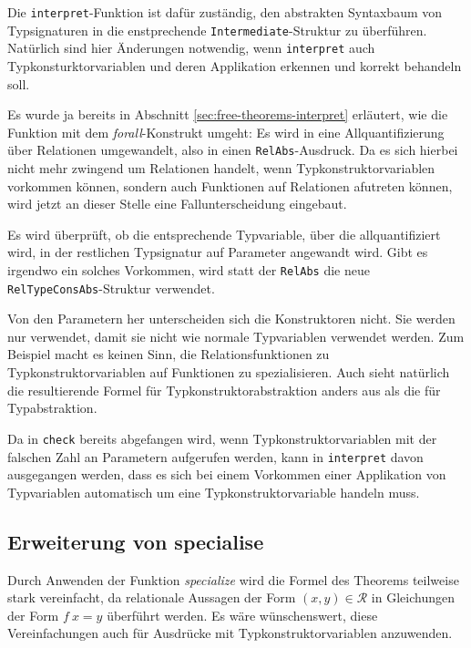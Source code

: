 Die \texttt{interpret}-Funktion ist dafür zuständig, den abstrakten Syntaxbaum von Typsignaturen in die enstprechende
\texttt{Intermediate}-Struktur zu überführen. Natürlich sind hier Änderungen notwendig, wenn \texttt{interpret} auch
Typkonsturktorvariablen und deren Applikation erkennen und korrekt behandeln soll.

Es wurde ja bereits in Abschnitt \ref{sec:free-theorems-interpret} erläutert, wie die Funktion mit dem \textit{forall}-Konstrukt
umgeht: Es wird in eine Allquantifizierung über Relationen umgewandelt, also in einen \texttt{RelAbs}-Ausdruck.
Da es sich hierbei nicht mehr zwingend um Relationen handelt, wenn Typkonstruktorvariablen vorkommen können, sondern auch
Funktionen auf Relationen afutreten können, wird jetzt an dieser Stelle eine Fallunterscheidung eingebaut.

Es wird überprüft, ob die entsprechende Typvariable, über die allquantifiziert wird, in der restlichen Typsignatur auf Parameter
angewandt wird. Gibt es irgendwo ein solches Vorkommen, wird statt der \texttt{RelAbs} die neue \texttt{RelTypeConsAbs}-Struktur
verwendet.

Von den Parametern her unterscheiden sich die Konstruktoren nicht. Sie werden nur verwendet, damit sie nicht wie normale
Typvariablen verwendet werden. Zum Beispiel macht es keinen Sinn, die Relationsfunktionen zu Typkonstruktorvariablen auf
Funktionen zu spezialisieren. Auch sieht natürlich die resultierende Formel für Typkonstruktorabstraktion anders aus als die
für Typabstraktion.

Da in \texttt{check} bereits abgefangen wird, wenn Typkonstruktorvariablen mit der falschen Zahl an Parametern aufgerufen
werden, kann in \texttt{interpret} davon ausgegangen werden, dass es sich bei einem Vorkommen einer
Applikation von Typvariablen automatisch um eine Typkonstruktorvariable handeln muss.



\subsection{Erweiterung von specialise}

Durch Anwenden der Funktion \textit{specialize} wird die Formel des Theorems teilweise stark vereinfacht, da relationale
Aussagen der Form $(x, y) \in \mathcal{R}$ in Gleichungen der Form $f\ x = y$ überführt werden. Es wäre wünschenswert,
diese Vereinfachungen auch für Ausdrücke mit Typkonstruktorvariablen anzuwenden.

